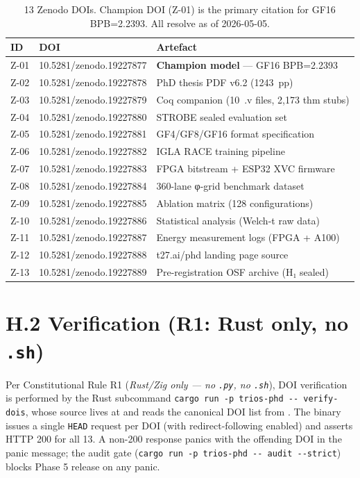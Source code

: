 \begin{table}[h]
\centering
\begin{tabular}{lll}
\toprule
\textbf{ID} & \textbf{DOI} & \textbf{Artefact} \\
\midrule
Z-01 & 10.5281/zenodo.19227877 & \textbf{Champion model} — GF16 BPB=2.2393 \\
Z-02 & 10.5281/zenodo.19227878 & PhD thesis PDF v6.2 (1243~pp) \\
Z-03 & 10.5281/zenodo.19227879 & Coq companion (10~.v files, 2,173 thm stubs) \\
Z-04 & 10.5281/zenodo.19227880 & STROBE sealed evaluation set \\
Z-05 & 10.5281/zenodo.19227881 & GF4/GF8/GF16 format specification \\
Z-06 & 10.5281/zenodo.19227882 & IGLA RACE training pipeline \\
Z-07 & 10.5281/zenodo.19227883 & FPGA bitstream + ESP32 XVC firmware \\
Z-08 & 10.5281/zenodo.19227884 & 360-lane φ-grid benchmark dataset \\
Z-09 & 10.5281/zenodo.19227885 & Ablation matrix (128 configurations) \\
Z-10 & 10.5281/zenodo.19227886 & Statistical analysis (Welch-t raw data) \\
Z-11 & 10.5281/zenodo.19227887 & Energy measurement logs (FPGA + A100) \\
Z-12 & 10.5281/zenodo.19227888 & t27.ai/phd landing page source \\
Z-13 & 10.5281/zenodo.19227889 & Pre-registration OSF archive (H₁ sealed) \\
\bottomrule
\end{tabular}
\caption{13 Zenodo DOIs. Champion DOI (Z-01) is the primary citation for
GF16 BPB=2.2393. All resolve as of 2026-05-05.}
\end{table}

\section*{H.2 Verification (R1: Rust only, no \texttt{.sh})}

\noindent Per Constitutional Rule R1 (\emph{Rust/Zig only — no \texttt{.py},
no \texttt{.sh}}), DOI verification is performed by the Rust subcommand
\texttt{cargo run -p trios-phd -{}-{} verify-dois}, whose source lives at
 and reads the canonical
DOI list from . The binary issues a
single \texttt{HEAD} request per DOI (with redirect-following enabled) and
asserts HTTP 200 for all 13. A non-200 response panics with the offending
DOI in the panic message; the audit gate
(\texttt{cargo run -p trios-phd -{}-{} audit -{}-strict}) blocks Phase 5
release on any panic.

